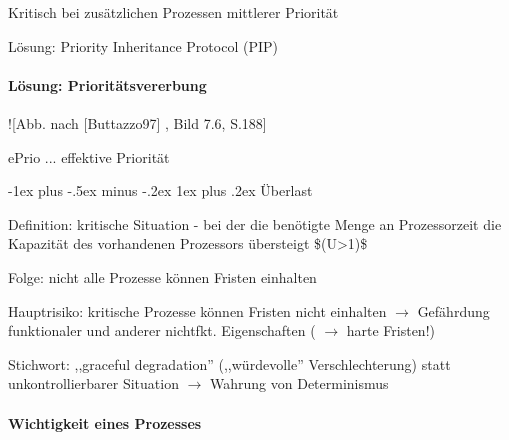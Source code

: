 \documentclass[a4paper]{article}
\makeatletter
\renewcommand{\subsubsection}{\@startsection{subsubsection}{3}{0mm}%
 {-1ex plus -.5ex minus -.2ex}%
 {1ex plus .2ex}%
 {\normalfont\small\bfseries}}
\makeatother
\begin{document}
\begin{multicols}{3}
    \begin{itemize*}
        \item
        Kritisch bei zusätzlichen Prozessen mittlerer Priorität
        \item
        \item
        Lösung: Priority Inheritance Protocol (PIP)
    \end{itemize*}


    \paragraph{Lösung:
        Prioritätsvererbung}

    \begin{itemize*}
        \item
        !{[}Abb. nach {[}Buttazzo97{]} , Bild 7.6, S.188{]}
        \item
        ePrio ... effektive Priorität
    \end{itemize*}


    \subsubsection{Überlast}

    \begin{itemize*}
        \item
        Definition: kritische Situation - bei der die benötigte Menge an
        Prozessorzeit die Kapazität des vorhandenen Prozessors übersteigt
        \$(U\textgreater1)\$
        \begin{itemize*}
            \item Folge: nicht alle Prozesse können Fristen einhalten
        \end{itemize*}
        \item
        Hauptrisiko: kritische Prozesse können Fristen nicht einhalten
        $\rightarrow$ Gefährdung funktionaler und anderer
        nichtfkt. Eigenschaften ( $\rightarrow$ harte Fristen!)
        \item
        Stichwort: ,,graceful degradation'' (,,würdevolle'' Verschlechterung)
        statt unkontrollierbarer Situation $\rightarrow$
        Wahrung von Determinismus
    \end{itemize*}


    \paragraph{Wichtigkeit eines
        Prozesses}


\end{multicols}
\end{document}
